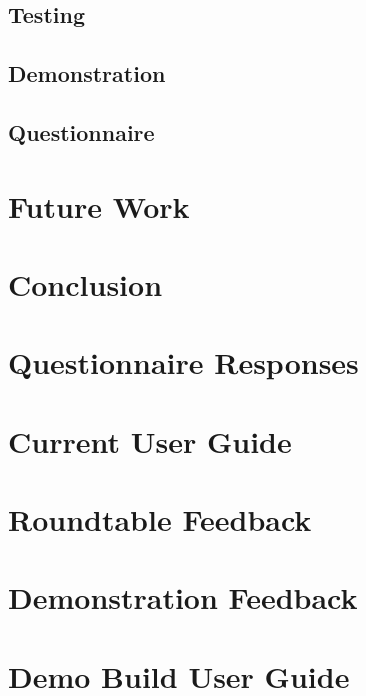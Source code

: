 \documentclass{l3proj}
\begin{document}
\section{Testing}
\label{eval:testing}


\section{Demonstration}
\label{eval:demo}


\section{Questionnaire}
\label{eval:question}



\chapter{Future Work}
\label{future}


\chapter{Conclusion}
\label{conc}

\appendix

\chapter{Questionnaire Responses}
\label{app:questionnaireResponses}


\chapter{Current User Guide}
\label{app:userGuideCurrent}


\chapter{Roundtable Feedback}
\label{app:roundtableFeedback}


\chapter{Demonstration Feedback}
\label{app:demonstrationFeedback}


\chapter{Demo Build User Guide}
\label{app:userGuideDemo}
%


\clearpage


\end{document}
